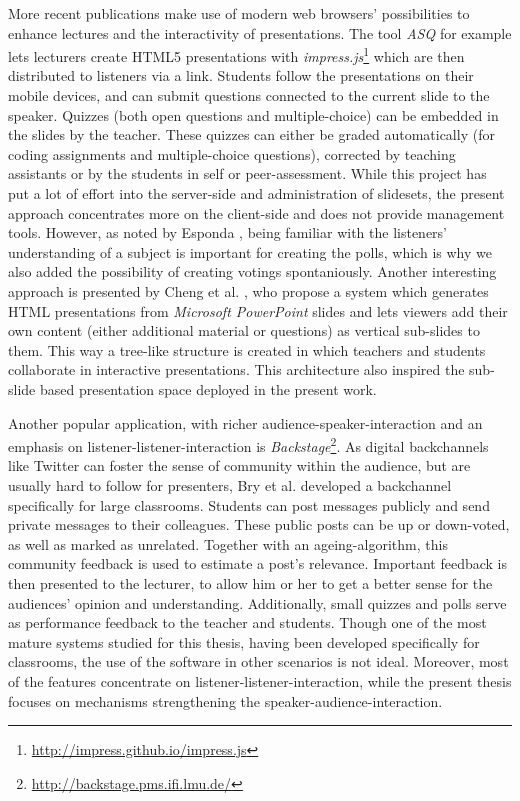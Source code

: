 More recent publications make use of modern web browsers' possibilities to enhance lectures and the interactivity of presentations. The tool \emph{ASQ} \cite{Triglianos:InteractiveWebPresentationsImpress} for example lets lecturers create HTML5 presentations with \emph{impress.js}\footnote{\url{http://impress.github.io/impress.js}} which are then distributed to listeners via a link. Students follow the presentations on their mobile devices, and can submit questions connected to the current slide to the speaker. Quizzes (both open questions and multiple-choice) can be embedded in the slides by the teacher. These quizzes can either be graded automatically (for coding assignments and multiple-choice questions), corrected by teaching assistants or by the students in self or peer-assessment. While this project has put a lot of effort into the server-side and administration of slidesets, the present approach concentrates more on the client-side and does not provide management tools. However, as noted by Esponda \cite{Esponda:ElectronicVotingOnTheFly}, being familiar with the listeners' understanding of a subject is important for creating the polls, which is why we also added the possibility of creating votings spontaniously.
Another interesting approach is presented by Cheng et al. \cite{Cheng:TreebasedOnlinePresentations}, who propose a system which generates HTML presentations from \emph{Microsoft PowerPoint} slides and lets viewers add their own content (either additional material or questions) as vertical sub-slides to them. This way a tree-like structure is created in which teachers and students collaborate in interactive presentations. This architecture also inspired the sub-slide based presentation space deployed in the present work.

Another popular application, with richer audience-spea\-ker-in\-ter\-ac\-tion and an emphasis on listener-listener-interaction is \emph{Backstage}\footnote{\url{http://backstage.pms.ifi.lmu.de/}}. As digital backchannels like Twitter can foster the sense of community within the audience, but are usually hard to follow for presenters, Bry et al.\cite{Bry:Backstage} developed a backchannel specifically for large classrooms. Students can post messages publicly and send private messages to their colleagues. These public posts can be up or down-voted, as well as marked as unrelated. Together with an ageing-algorithm, this community feedback is used to estimate a post's relevance. Important feedback is then presented to the lecturer, to allow him or her to get a better sense for the audiences' opinion and understanding. Additionally, small quizzes and polls serve as performance feedback to the teacher and students. Though one of the most mature systems studied for this thesis, having been developed specifically for classrooms, the use of the software in other scenarios is not ideal. Moreover, most of the features concentrate on listener-listener-interaction, while the present thesis focuses on mechanisms strengthening the speaker-audience-interaction.

